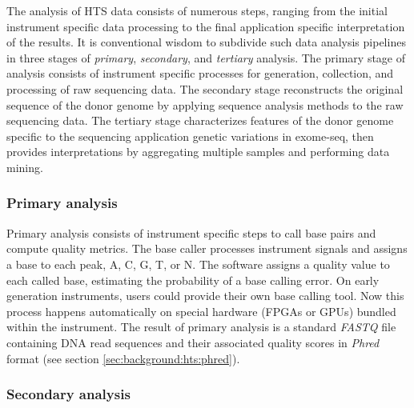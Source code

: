 The analysis of HTS data consists of numerous steps, ranging from the initial instrument specific data processing to the final application specific interpretation of the results.
It is conventional wisdom to subdivide such data analysis pipelines in three stages of \emph{primary}, \emph{secondary}, and \emph{tertiary} analysis.
The primary stage of analysis consists of instrument specific processes for generation, collection, and processing of raw sequencing data.
The secondary stage reconstructs the original sequence of the donor genome by applying sequence analysis methods to the raw sequencing data.
The tertiary stage characterizes features of the donor genome specific to the sequencing application \eg genetic variations in exome-seq, then provides interpretations \eg by aggregating multiple samples and performing data mining.


\subsubsection{Primary analysis}

Primary analysis consists of instrument specific steps to call base pairs and compute quality metrics.
The base caller processes instrument signals and assigns a base to each peak, \ie A, C, G, T, or N.
The software assigns a quality value to each called base, estimating the probability of a base calling error.
On early generation instruments, users could provide their own base calling tool.
Now this process happens automatically on special hardware (\eg FPGAs or GPUs) bundled within the instrument.
The result of primary analysis is a standard \emph{FASTQ} file containing DNA read sequences and their associated quality scores in \emph{Phred} format (see section \ref{sec:background:hts:phred}).

\subsubsection{Secondary analysis}

